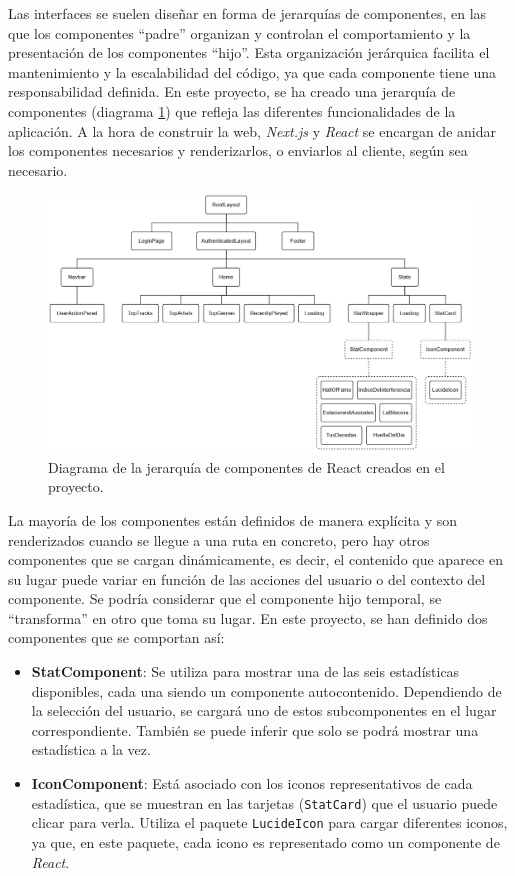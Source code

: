 Las interfaces se suelen diseñar en forma de jerarquías de componentes, en las que los componentes ``padre'' organizan y controlan el comportamiento y la presentación de los componentes ``hijo''. Esta organización jerárquica facilita el mantenimiento y la escalabilidad del código, ya que cada componente tiene una responsabilidad definida. En este proyecto, se ha creado una jerarquía de componentes (diagrama \ref{fig:componentes_react}) que refleja las diferentes funcionalidades de la aplicación. A la hora de construir la web, \textit{Next.js} y \textit{React} se encargan de anidar los componentes necesarios y renderizarlos, o enviarlos al cliente, según sea necesario.

\begin{figure}[H]
    \centering
    \includegraphics[width=\textwidth]{figures/componentes_react.png}
    \caption{Diagrama de la jerarquía de componentes de React creados en el proyecto.}
    \label{fig:componentes_react}
\end{figure}

La mayoría de los componentes están definidos de manera explícita y son renderizados cuando se llegue a una ruta en concreto, pero hay otros componentes que se cargan dinámicamente, es decir, el contenido que aparece en su lugar puede variar en función de las acciones del usuario o del contexto del componente. Se podría considerar que el componente hijo temporal, se ``transforma'' en otro que toma su lugar. En este proyecto, se han definido dos componentes que se comportan así:

\begin{itemize}
    \item \textbf{StatComponent}: Se utiliza para mostrar una de las seis estadísticas disponibles, cada una siendo un componente autocontenido. Dependiendo de la selección del usuario, se cargará uno de estos subcomponentes en el lugar correspondiente. También se puede inferir que solo se podrá mostrar una estadística a la vez.
    \item \textbf{IconComponent}: Está asociado con los iconos representativos de cada estadística, que se muestran en las tarjetas (\texttt{StatCard}) que el usuario puede clicar para verla. Utiliza el paquete \texttt{LucideIcon} para cargar diferentes iconos, ya que, en este paquete, cada icono es representado como un componente de \textit{React}.
\end{itemize}

